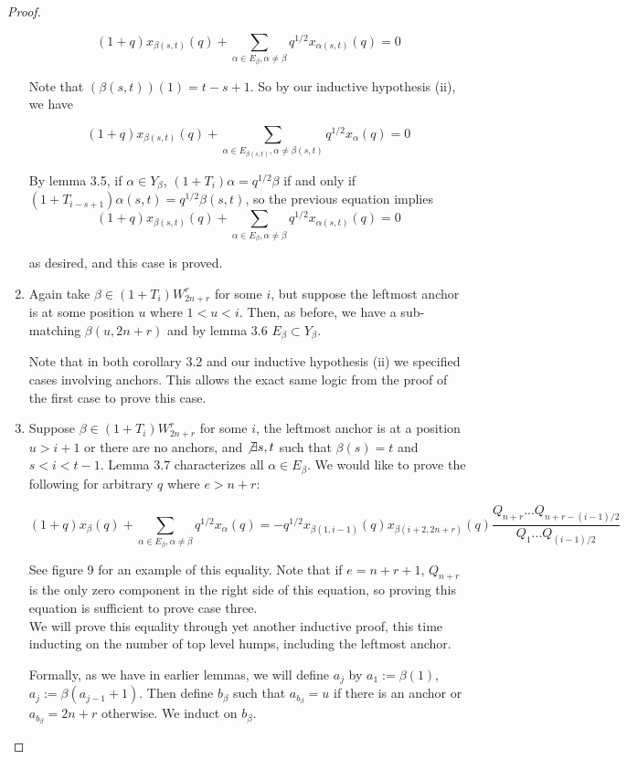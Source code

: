 \documentclass{amsart}
\begin{document}
\begin{proof}
\begin{enumerate}
	$$(1+q)x_{\beta(s,t)}(q)+\sum_{\alpha\in E_\beta,\alpha\not=\beta}q^{1/2}x_{\alpha(s,t)}(q)=0$$
	
	Note that $(\beta(s,t))(1)=t-s+1$. So by our inductive hypothesis (ii), we have 
	
	$$(1+q)x_{\beta(s,t)}(q)+\sum_{\alpha\in E_{\beta(s,t)},\alpha\not=\beta(s,t)}q^{1/2}x_{\alpha}(q)=0$$
	
	By lemma 3.5, if $\alpha\in Y_\beta$, $(1+T_i)\alpha=q^{1/2}\beta$ if and only if $(1+T_{i-s+1})\alpha(s,t)=q^{1/2}\beta(s,t)$, so the previous equation implies $$(1+q)x_{\beta(s,t)}(q)+\sum_{\alpha\in E_\beta,\alpha\not=\beta}q^{1/2}x_{\alpha(s,t)}(q)=0$$
	
	as desired, and this case is proved.
	
	\vspace{5mm}
	\item Again take $\beta\in (1+T_i)W_{2n+r}^r$ for some $i$, but suppose the leftmost anchor is at some position $u$ where $1<u<i$. Then, as before, we have a sub-matching $\beta(u,2n+r)$ and by lemma 3.6 $E_\beta\subset Y_\beta$.
	
	Note that in both corollary 3.2 and our inductive hypothesis (ii) we specified cases involving anchors. This allows the exact same logic from the proof of the first case to prove this case.
	
	\vspace{5mm}
	\item Suppose $\beta\in (1+T_i)W_{2n+r}^r$ for some $i$, the leftmost anchor is at a position $u>i+1$ or there are no anchors, and $\not\exists s,t$ such that $\beta(s)=t$ and $s<i<t-1$. Lemma $3.7$ characterizes all $\alpha\in E_\beta$. We would like to prove the following for arbitrary $q$ where $e>n+r$:
	
	$$(1+q)x_\beta(q)+\sum_{\alpha\in E_\beta,\alpha\not=\beta}q^{1/2}x_\alpha(q)=-q^{1/2}x_{\beta(1,i-1)}(q)x_{\beta(i+2,2n+r)}(q)\frac{Q_{n+r}...Q_{n+r-(i-1)/2}}{Q_1...Q_{(i-1)/2}}$$
	
	See figure 9 for an example of this equality. Note that if $e=n+r+1$, $Q_{n+r}$ is the only zero component in the right side of this equation, so proving this equation is sufficient to prove case three.
	\\
	
	We will prove this equality through yet another inductive proof, this time inducting on the number of top level humps, including the leftmost anchor.
	
	Formally, as we have in earlier lemmas, we will define $a_j$ by $a_1:=\beta(1)$, $a_j:=\beta(a_{j-1}+1)$. Then define $b_\beta$ such that $a_{b_\beta}=u$ if there is an anchor or $a_{b_\beta}=2n+r$ otherwise. We induct on $b_\beta$.
	\\
	

\end{enumerate}
\end{proof}
\end{document}
